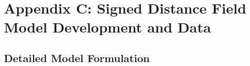 
\chapter{Appendix C: Signed Distance Field Model Development and Data}\label{ch:appendix-a}

\section{Detailed Model Formulation}


